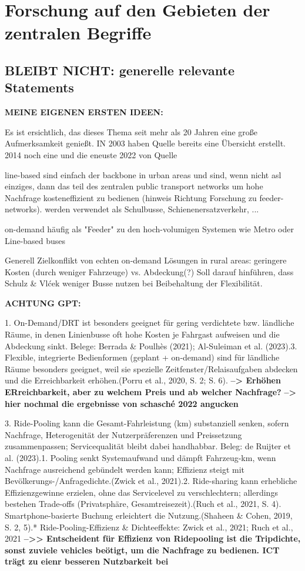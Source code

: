 \section{Forschung auf den Gebieten der zentralen Begriffe}
\label{sec:2.1}
\label{sec:Kontext}

\subsection{ BLEIBT NICHT: generelle relevante Statements}
\textbf{ MEINE EIGENEN ERSTEN IDEEN:}

Es ist ersichtlich, das dieses Thema seit mehr als 20 Jahren eine große Aufmerksamkeit genießt. IN 2003 haben Quelle bereits eine Übersicht erstellt. 2014 noch eine und die eneuste 2022 von Quelle


line-based sind einfach der backbone in urban areas und sind, wenn nicht asl einziges, dann das teil des zentralen public transport networks um hohe Nachfrage kosteneffizient zu bedienen (hinweis Richtung Forschung zu feeder-networks). werden verwendet als Schulbusse, Schienenersatzverkehr, ...

on-demand häufig als "Feeder" zu den hoch-volumigen Systemen wie Metro oder Line-based buses

Generell Zielkonflikt von echten on-demand Lösungen in rural areas: geringere Kosten (durch weniger Fahrzeuge) vs. Abdeckung(?) Soll darauf hinführen, dass Schulz \& Vlćek weniger Busse nutzen bei Beibehaltung der Flexibilität.

\textbf{ACHTUNG GPT:}


1. On-Demand/DRT ist besonders geeignet für gering verdichtete bzw. ländliche Räume, in denen Linienbusse oft hohe Kosten je Fahrgast aufweisen und die Abdeckung sinkt. Belege: Berrada \& Poulhès (2021); Al-Suleiman et al. (2023).3. Flexible, integrierte Bedienformen (geplant + on-demand) sind für ländliche Räume besonders geeignet, weil sie spezielle Zeitfenster/Relaisaufgaben abdecken und die Erreichbarkeit erhöhen.(Porru et al., 2020, S. 2; S. 6).
\textbf{--> Erhöhen ERreichbarkeit, aber zu welchem Preis und ab welcher Nachfrage?}
\textbf{--> hier nochmal die ergebnisse von schasché 2022 angucken}

3. Ride-Pooling kann die Gesamt-Fahrleistung (km) substanziell senken, sofern Nachfrage, Heterogenität der Nutzerpräferenzen und Preissetzung zusammenpassen; Servicequalität bleibt dabei handhabbar. Beleg: de Ruijter et al. (2023).1. Pooling senkt Systemaufwand und dämpft Fahrzeug-km, wenn Nachfrage ausreichend gebündelt werden kann; Effizienz steigt mit Bevölkerungs-/Anfragedichte.(Zwick et al., 2021).2. Ride-sharing kann erhebliche Effizienzgewinne erzielen, ohne das Servicelevel zu verschlechtern; allerdings bestehen Trade-offs (Privatsphäre, Gesamtreisezeit).(Ruch et al., 2021, S. 4). Smartphone-basierte Buchung erleichtert die Nutzung.(Shaheen \& Cohen, 2019, S. 2, 5).* Ride-Pooling-Effizienz \& Dichteeffekte: Zwick et al., 2021; Ruch et al., 2021
\textbf{-->> Entscheident für Effizienz von Ridepooling ist die Tripdichte, sonst zuviele vehicles beötigt, um die Nachfrage zu bedienen. ICT trägt zu eienr besseren Nutzbarkeit bei}

